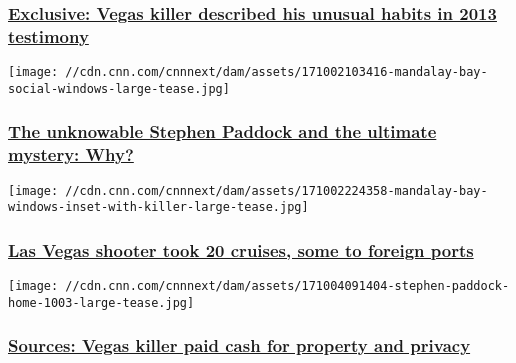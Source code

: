 \hypertarget{exclusive-vegas-killer-described-his-unusual-habits-in-2013-testimony}{%
\subsubsection{\texorpdfstring{\href{/2017/10/09/us/las-vegas-stephen-paddock-deposition/index.html}{Exclusive:
Vegas killer described his unusual habits in 2013
testimony}}{Exclusive: Vegas killer described his unusual habits in 2013 testimony}}\label{exclusive-vegas-killer-described-his-unusual-habits-in-2013-testimony}}

\href{/2017/10/06/us/unknowable-stephen-paddock-and-the-mystery-motive/index.html}{}

\texttt{[image: //cdn.cnn.com/cnnnext/dam/assets/171002103416-mandalay-bay-social-windows-large-tease.jpg]}

\hypertarget{the-unknowable-stephen-paddock-and-the-ultimate-mystery-why}{%
\subsubsection{\texorpdfstring{\href{/2017/10/06/us/unknowable-stephen-paddock-and-the-mystery-motive/index.html}{The
unknowable Stephen Paddock and the ultimate mystery:
Why?}}{The unknowable Stephen Paddock and the ultimate mystery: Why?}}\label{the-unknowable-stephen-paddock-and-the-ultimate-mystery-why}}

\href{/2017/10/06/us/vegas-shooter-paddock-foreign-cruises/index.html}{}

\texttt{[image: //cdn.cnn.com/cnnnext/dam/assets/171002224358-mandalay-bay-windows-inset-with-killer-large-tease.jpg]}

\hypertarget{las-vegas-shooter-took-20-cruises-some-to-foreign-ports}{%
\subsubsection{\texorpdfstring{\href{/2017/10/06/us/vegas-shooter-paddock-foreign-cruises/index.html}{Las
Vegas shooter took 20 cruises, some to foreign
ports}}{Las Vegas shooter took 20 cruises, some to foreign ports}}\label{las-vegas-shooter-took-20-cruises-some-to-foreign-ports}}

\href{/2017/10/04/us/paddock-profile-house-cash-fence-invs/index.html}{}

\texttt{[image: //cdn.cnn.com/cnnnext/dam/assets/171004091404-stephen-paddock-home-1003-large-tease.jpg]}

\hypertarget{sources-vegas-killer-paid-cash-for-property-and-privacy}{%
\subsubsection{\texorpdfstring{\href{/2017/10/04/us/paddock-profile-house-cash-fence-invs/index.html}{Sources:
Vegas killer paid cash for property and
privacy}}{Sources: Vegas killer paid cash for property and privacy}}\label{sources-vegas-killer-paid-cash-for-property-and-privacy}}


